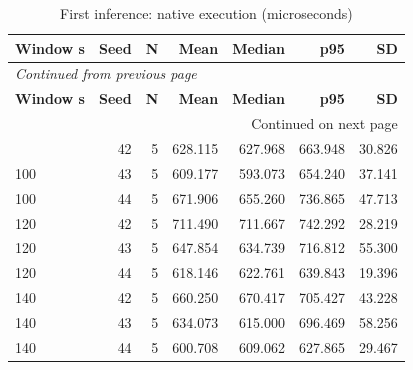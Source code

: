 \documentclass[10pt,a4paper]{article}
\begin{document}
\begin{longtable}{@{}lrrrrrr@{}}
\caption{First inference:\allowbreak{} native execution (microseconds)}\\
\toprule
\textbf{Window s} & \textbf{Seed} & \textbf{N} & \textbf{Mean} & \textbf{Median} & \textbf{p95} & \textbf{SD} \\
\midrule\endfirsthead
\multicolumn{7}{l}{\small\itshape Continued from previous page}\\
\toprule
\textbf{Window s} & \textbf{Seed} & \textbf{N} & \textbf{Mean} & \textbf{Median} & \textbf{p95} & \textbf{SD} \\
\midrule\endhead
\midrule\multicolumn{7}{r}{\small Continued on next page}\\\endfoot
\bottomrule\endlastfoot
100 & 42 & 5 & 628.115 & 627.968 & 663.948 & 30.826 \\
100 & 43 & 5 & 609.177 & 593.073 & 654.240 & 37.141 \\
100 & 44 & 5 & 671.906 & 655.260 & 736.865 & 47.713 \\
120 & 42 & 5 & 711.490 & 711.667 & 742.292 & 28.219 \\
120 & 43 & 5 & 647.854 & 634.739 & 716.812 & 55.300 \\
120 & 44 & 5 & 618.146 & 622.761 & 639.843 & 19.396 \\
140 & 42 & 5 & 660.250 & 670.417 & 705.427 & 43.228 \\
140 & 43 & 5 & 634.073 & 615.000 & 696.469 & 58.256 \\
140 & 44 & 5 & 600.708 & 609.062 & 627.865 & 29.467 \\
\end{longtable}\endgroup
\begingroup\small\setlength{\tabcolsep}{4pt}\renewcommand{\arraystretch}{1.12}
\end{document}
